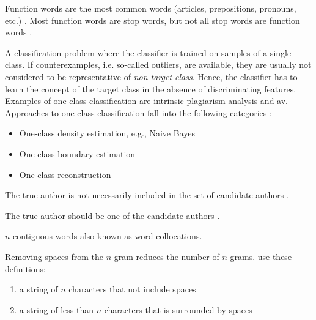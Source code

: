 \begin{definition}
    Function words are the most common words (articles, prepositions, pronouns, etc.) \cite{stamatatos_survey_2009}.
    Most function words are stop words, but not all stop words are function words \cite{stein_intrinsic_2011}.
\end{definition}

\begin{definition}
    A classification problem where the classifier is trained on samples of a single class.
    If counterexamples, i.e. so-called outliers, are available, they are usually not considered to be representative of \textit{non-target class}.
    Hence, the classifier has to learn the concept of the target class in the absence of discriminating features.
    Examples of one-class classification are intrinsic plagiarism analysis and \ac{av}.
    Approaches to one-class classification fall into the following categories \cite{stein_intrinsic_2011}:
    \begin{itemize}
        \item One-class density estimation, e.g., Naive Bayes
        \item One-class boundary estimation
        \item One-class reconstruction
    \end{itemize}
\end{definition}

\begin{definition}
    The true author is not necessarily included in the set of candidate authors \cite{stamatatos_survey_2009}.
\end{definition}

\begin{definition}
    The true author should be one of the candidate authors \cite{stamatatos_survey_2009,koppel_authorship_2011}.
\end{definition}

\begin{definition}
    [n-gram]
    $n$ contiguous words also known as word collocations.
\end{definition}

\begin{definition}
    Removing spaces from the $n$-gram reduces the number of $n$-grams.
    \citet{koppel_authorship_2011} use these definitions:
    \begin{enumerate}
        \item a string of $n$ characters that not include spaces
        \item a string of less than $n$ characters that is surrounded by spaces
    \end{enumerate}
\end{definition}

